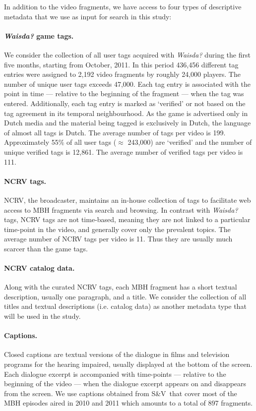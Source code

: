 In addition to the video fragments, we have access to four types of descriptive metadata that we use as input for search in this study:
\paragraph{\textbf{\textit{Waisda?} game tags.}} We consider the collection of all user tags acquired with \textit{Waisda?} during the first five months, starting from October, 2011. In this period 436,456 different tag entries were assigned to 2,192 video fragments by roughly 24,000 players. The number of unique user tags exceeds 47,000. Each tag entry is associated with the point in time --- relative to the beginning of the fragment --- when the tag was entered. Additionally, each tag entry is marked as `verified' or not based on the tag agreement in its temporal neighbourhood.
As the game is advertised only in Dutch media and the material being tagged is exclusively in Dutch, the language of almost all tags is Dutch. The average number of tags per video is 199. Approximately 55\% of all user tags ($\approx$ 243,000) are `verified' and the number of unique verified tags is 12,861. The average number of verified tags per video is 111.
\paragraph{\textbf{NCRV tags.}} NCRV, the broadcaster, maintains an in-house collection of tags %
to facilitate web access to MBH fragments via search and browsing. In contrast with \textit{Waisda?} tags, NCRV tags are not time-based, meaning they are not linked to a particular time-point in the video, and generally cover only the prevalent topics. The average number of NCRV tags per video is 11. Thus they are usually much scarcer than the game tags.
\paragraph{\textbf{NCRV catalog data}.} Along with the curated NCRV tags, each MBH fragment has a short textual description, usually one paragraph, and a title. We consider the collection of all titles and textual descriptions (i.e. catalog data) as another metadata type that will be used in the study.
\paragraph{\textbf{Captions}.} %
Closed captions are textual versions of the dialogue in films and television programs for the hearing impaired, usually displayed at the bottom of the screen. Each dialogue excerpt is accompanied with time-points --- relative to the beginning of the video --- when the dialogue excerpt appears on and disappears from the screen. We use captions  obtained from S\&V\ that cover most of the MBH episodes aired in 2010 and 2011 which amounts to a total of 897 fragments. 
 
